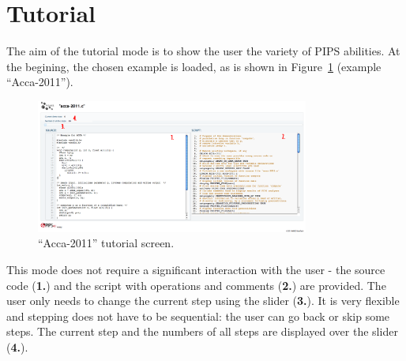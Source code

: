 \section{Tutorial}

The aim of the tutorial mode is to show the user the variety of PIPS
abilities. At the begining, the chosen example is loaded, as is shown
in Figure~\ref{fig:tutorial_screen} (example ``Acca-2011'').

\begin{figure}[h!]
  \centering
  \includegraphics[width=0.8\textwidth]{reportCh4/tutorial_screen}
  \caption{``Acca-2011'' tutorial screen.}
  \label{fig:tutorial_screen}
\end{figure}

This mode does not require a significant interaction with the user -
the source code ({\bf 1.}) and the script with operations and comments
({\bf 2.}) are provided. The user only needs to change the current
step using the slider ({\bf 3.}). It is very flexible and stepping
does not have to be sequential: the user can go back or skip some
steps. The current step and the numbers of all steps are displayed
over the slider ({\bf 4.}).
